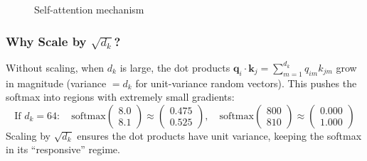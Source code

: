 \begin{figure}[htbp]
    \centering
    \caption{Self-attention mechanism}
    \label{fig:self_attention}
\end{figure}

\subsubsection{Why Scale by $\sqrt{d_k}$?}

Without scaling, when $d_k$ is large, the dot products $\mathbf{q}_i \cdot \mathbf{k}_j = \sum_{m=1}^{d_k} q_{im} k_{jm}$ grow in magnitude (variance $= d_k$ for unit-variance random vectors). This pushes the softmax into regions with extremely small gradients:
\begin{equation}
\text{If } d_k = 64: \quad \text{softmax}\begin{pmatrix} 8.0 \\ 8.1 \end{pmatrix} \approx \begin{pmatrix} 0.475 \\ 0.525 \end{pmatrix}, \quad \text{softmax}\begin{pmatrix} 800 \\ 810 \end{pmatrix} \approx \begin{pmatrix} 0.000 \\ 1.000 \end{pmatrix}
\end{equation}
Scaling by $\sqrt{d_k}$ ensures the dot products have unit variance, keeping the softmax in its ``responsive'' regime.

